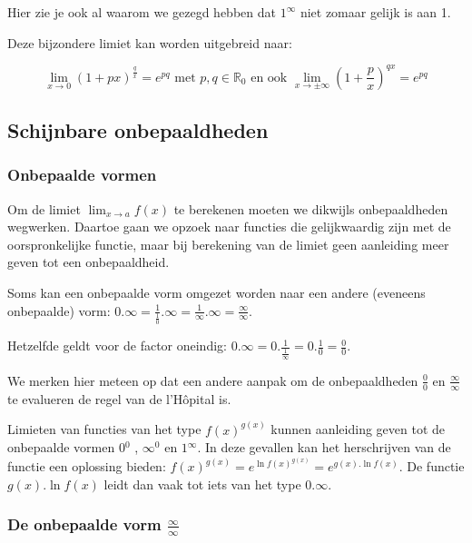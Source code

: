 Hier zie je ook al waarom we gezegd hebben dat $1^{\infty}$
niet zomaar gelijk is aan 1.

Deze bijzondere limiet kan worden uitgebreid naar:

\begin{equation*}
\lim_{x\to0}\left(1+px\right)^{\frac{q}{x}}=e^{pq}\text{ met }p,q\in\mathbb{R}_{0}\text{ en ook } \lim_{x\to\pm\infty}\left(1+\frac{p}{x}\right)^{qx}=e^{pq}
\end{equation*}

\subsection{Schijnbare onbepaaldheden}

\subsubsection{Onbepaalde vormen}

Om de limiet ${\displaystyle \lim_{x\to a}}f(x)$ te berekenen moeten
we dikwijls onbepaaldheden wegwerken. Daartoe gaan we opzoek naar
functies die gelijkwaardig zijn met de oorspronkelijke functie, maar
bij berekening van de limiet geen aanleiding meer geven tot een onbepaaldheid.

Soms kan een onbepaalde vorm omgezet worden naar een andere
(eveneens onbepaalde) vorm: ${\displaystyle 0.\infty=\frac{1}{\frac{1}{0}}.\infty=\frac{1}{\infty}.\infty=\frac{\infty}{\infty}}$.

Hetzelfde geldt voor de factor oneindig: ${\displaystyle 0.\infty=0.\frac{1}{\frac{1}{\infty}}=0.\frac{1}{0}=\frac{0}{0}}$.

We merken hier meteen op dat een andere aanpak om de onbepaaldheden
$\frac{0}{0}$ en $\frac{\infty}{\infty}$ te evalueren de regel van
de l'H\^opital is.

Limieten van functies van het type $f(x)^{g(x)}$ kunnen
aanleiding geven tot de onbepaalde vormen $0{}^{0}$ , $\infty{}^{0}$
en $1{}^{\infty}$. In deze gevallen kan het herschrijven van de functie
een oplossing bieden: ${\displaystyle f(x)^{g(x)}=e^{\ln f(x)^{g(x)}}=e^{g(x).\ln f(x)}}$.
De functie $g(x).\ln f(x)$ leidt dan vaak tot iets van het type $0.\infty$.


\subsubsection{De onbepaalde vorm $\frac{\infty}{\infty}$}

